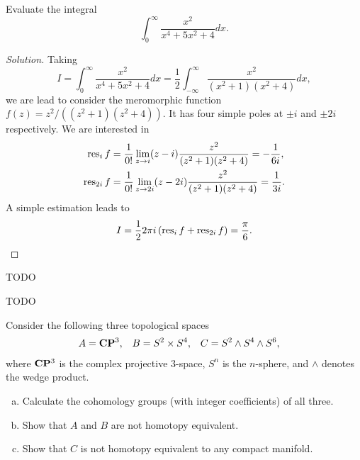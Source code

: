 
Evaluate the integral
\[
\int_0^\infty \frac{x^2}{x^4 + 5 x^2 + 4} d x.
\]

\begin{proof}[Solution]
  Taking
  \[
  I =
  \int_0^\infty \frac{x^2}{x^4 + 5 x^2 + 4} d x =
  \frac{1}{2} \int_{-\infty}^\infty \frac{x^2}{(x^2+1)(x^2+4)} d x,
  \]
  we are lead to consider the meromorphic function $f(z) = z^2/((z^2+1)(z^2+4))$. It has four simple poles at $\pm i$ and $\pm 2i$ respectively. We are interested in
  \begin{align*}
    \operatorname{res}_i f &=
    \frac{1}{0!} \lim_{z \rightarrow i} (z-i) \frac{z^2}{(z^2+1)(z^2+4)} =
    -\frac{1}{6 i}, \\
    \operatorname{res}_{2 i} f &=
    \frac{1}{0!} \lim_{z \rightarrow 2i} (z-2i) \frac{z^2}{(z^2+1)(z^2+4)} =
    \frac{1}{3 i}.
  \end{align*}
  A simple estimation leads to
  \[
  I =
  \frac{1}{2} 2 \pi i \left( \operatorname{res}_i f + \operatorname{res}_{2i} f \right) =
  \frac{\pi}{6}. \qedhere
  \]
\end{proof}


TODO


TODO


Consider the following three topological spaces
\begin{align*}
  A &= \mathbf{C}\mathbf{P}^3, &
  B &= S^2 \times S^4, &
  C &= S^2 \wedge S^4 \wedge S^6,
\end{align*}
where $\mathbf{C}\mathbf{P}^3$ is the complex projective $3$-space, $S^n$ is the $n$-sphere, and $\wedge$ denotes the wedge product.
\begin{enumerate}[(a)]
\item Calculate the cohomology groups (with integer coefficients) of all three.
\item Show that $A$ and $B$ are not homotopy equivalent.
\item Show that $C$ is not homotopy equivalent to any compact manifold.
\end{enumerate}

